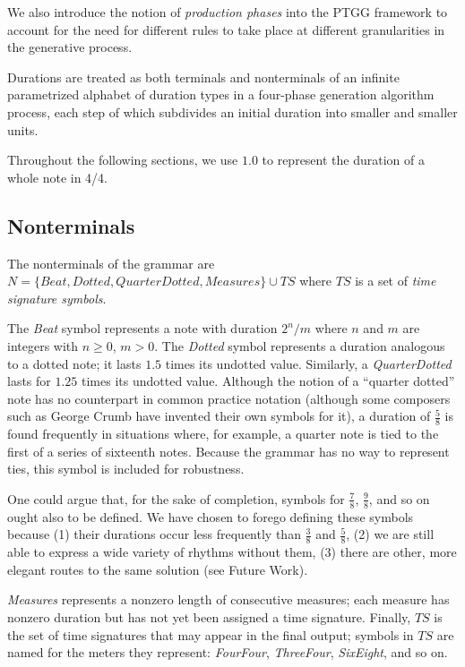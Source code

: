 \documentclass{article}
\begin{document}
We also introduce the notion of \emph{production phases} into the PTGG framework to account for the need for different rules to take place at different granularities in the generative process.

Durations are treated as both terminals and nonterminals of an infinite parametrized alphabet of duration types in a four-phase generation algorithm process, each step of which subdivides an initial duration into smaller and \linebreak smaller units.

Throughout the following sections, we use $1.0$ to represent the duration of a whole note in 4/4.

\subsection{Nonterminals}

The nonterminals of the grammar are $N=\{Beat,\allowbreak Dotted,\allowbreak QuarterDotted,\allowbreak Measures \} \cup TS$ where $TS$ is a set of \emph{time signature symbols}. 


The \emph{Beat} symbol represents a note with duration $2^n/m$ where $n$ and $m$ are integers with $n \geq 0$, $m > 0$. The \emph{Dotted} symbol represents a duration analogous to a dotted note; it lasts $1.5$ times its undotted value. Similarly, a \emph{QuarterDotted} lasts for $1.25$ times its undotted value. Although the notion of a ``quarter dotted'' note has no counterpart in common practice notation (although some composers such as George Crumb have invented their own symbols for it), a duration of $\frac{5}{8}$ is found frequently in situations where, for example, a quarter note is tied to the first of a series of sixteenth notes. Because the grammar has no way to represent ties, this symbol is included for robustness.

One could argue that, for the sake of completion, symbols for $\frac{7}{8}$, $\frac{9}{8}$, and so on ought also to be defined. We have chosen to forego defining these symbols because (1) their durations occur less frequently than $\frac{3}{8}$ and $\frac{5}{8}$, (2) we are still able to express a wide variety of rhythms without them, (3) there are other, more elegant routes to the same solution (see Future Work).


\emph{Measures} represents a nonzero length of consecutive measures; each measure has nonzero duration but has not yet been assigned a time signature. Finally, $TS$ is the set of time signatures that may appear in the final output; symbols in $TS$ are named for the meters they represent: \emph{FourFour}, \emph{ThreeFour}, \emph{SixEight}, and so on. 
 
\end{document}
